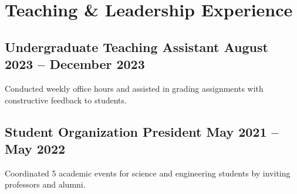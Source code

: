 \section{Teaching \& Leadership Experience}





\subsection{{Undergraduate Teaching Assistant \hfill August 2023 – December 2023}}
\begin{zitemize}
\item Conducted weekly office hours and assisted in grading assignments with constructive feedback to students. 

\end{zitemize}

\subsection{{Student Organization President \hfill May 2021 – May 2022}}
\begin{zitemize}

\item Coordinated 5 academic events for science and engineering students by inviting professors and alumni.

\end{zitemize}

